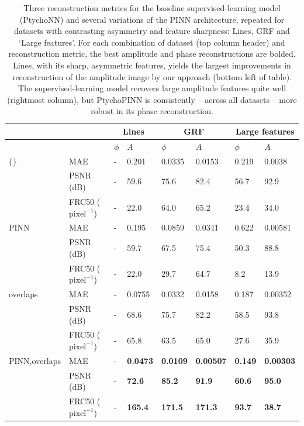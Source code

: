 \documentclass[sn-mathphys]{sn-jnl}%
\theoremstyle{thmstyleone}%
\theoremstyle{thmstyletwo}%
\theoremstyle{thmstylethree}%
\begin{document}
\begin{table}[h]
\begin{center}
\caption{Three reconstruction metrics for the baseline supervised-learning model (PtychoNN) and several variations of the PINN architecture, repeated for datasets with contrasting asymmetry and feature sharpness: Lines, GRF and `Large features'. For each combination of dataset (top column header) and reconstruction metric, the best amplitude and phase reconstructions are bolded. Lines, with its sharp, asymmetric features, yields the largest improvements in reconstruction of the amplitude image by our approach (bottom left of table). The supervised-learning model recovers large amplitude features quite well (rightmost column), but PtychoPINN is consistently -- across all datasets -- more robust in its phase reconstruction.  
}\label{tab1}
\begin{tabular}{p{2cm}l|ll|ll|ll}
\toprule
& \multicolumn{1}{c}{} & \multicolumn{2}{c}{Lines} & \multicolumn{2}{c}{GRF} & \multicolumn{2}{c}{Large features}\\
\midrule
&
& $\phi$ & $A$
& $\phi$ & $A$
& $\phi$ & $A$ \\
\midrule
$\{\}$\footnotemark[1]
& MAE & - & 0.201 & 0.0335 & 0.0153 & 0.219 & 0.0038 \\
& PSNR (dB) & - & 59.6 & 75.6 & 82.4 & 56.7 & 92.9 \\
& FRC50 ($\mathrm{pixel}^{-1}$) & - & 22.0 & 64.0 & 65.2 & 23.4 & 34.0 \\
\midrule
PINN
& MAE & - & 0.195 & 0.0859 & 0.0341 & 0.622 & 0.00581 \\
& PSNR (dB) & - & 59.7 & 67.5 & 75.4 & 50.3 & 88.8 \\
& FRC50 ($\mathrm{pixel}^{-1}$) & - & 22.0 & 29.7 & 64.7 & 8.2 & 13.9 \\
\midrule
overlaps
& MAE & - & 0.0755 & 0.0332 & 0.0158 & 0.187 & 0.00352 \\
& PSNR (dB) & - & 68.6 & 75.7 & 82.2 & 58.5 & 93.8 \\
& FRC50 ($\mathrm{pixel}^{-1}$) & - & 65.8 & 63.5 & 65.0 & 27.6 & 35.9 \\
\midrule
PINN,overlaps\footnotemark[2]
& MAE & - & \textbf{0.0473} & \textbf{0.0109} & \textbf{0.00507} & \textbf{0.149} & \textbf{0.00303} \\
& PSNR (dB) & - & \textbf{72.6} & \textbf{85.2} & \textbf{91.9} & \textbf{60.6} & \textbf{95.0} \\
& FRC50 ($\mathrm{pixel}^{-1}$) & - & \textbf{165.4} & \textbf{171.5} & \textbf{171.3} & \textbf{93.7} & \textbf{38.7} \\
\midrule
\end{tabular}
\end{center}
\end{table}
\end{document}
